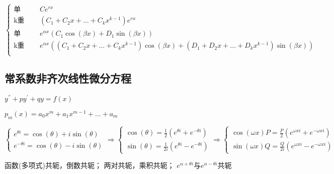 \documentclass[UTF8]{ctexart}
\begin{document}
$\left\{ 
    \begin{array}{ll}
        \text{单实根}   &\quad Ce^{rx}\\
        \text{k重实根}  &\quad \left( C_1+C_2x+\dots +C_kx^{k-1}\right)e^{rx}\\
        \text{单复根}   &\quad e^{\alpha x}\left(C_1\cos\left(\beta x \right) +D_1\sin\left(\beta x \right)\right)\\
        \text{k重复根}  &\quad e^{\alpha x}\left(\left(C_1+C_2x+\dots+C_kx^{k-1} \right)\cos\left(\beta x \right) +\left(D_1+D_2x+\dots+D_kx^{k-1} \right)\sin\left(\beta x \right)\right)\\
    \end{array}
\right.$

\subsection{常系数非齐次线性微分方程}
$y^{''}+py^{'}+qy=f\left(x\right)$\par

$p_m\left(x\right)=a_0x^m+a_1x^{m-1}+\dots+a_m$\par

$
\left\{
\begin{array}{l}
e^{\theta i}=\cos\left(\theta\right)+i\sin\left(\theta\right)\\
e^{-\theta i}=\cos\left(\theta\right)-i\sin\left(\theta\right)
\end{array}
\right.
\Rightarrow
\left\{
\begin{array}{l}
    \cos\left(\theta\right)=\frac{1}{2}\left(e^{\theta i}+e^{-\theta i}\right)\\
    \sin\left(\theta\right)=\frac{1}{2i}\left(e^{\theta i}-e^{-\theta i}\right)
\end{array}
\right.
\Rightarrow
\left\{
\begin{array}{l}
    \cos\left(\omega x \right)P=\frac{P}{2}\left(e^{\omega x i}+e^{-\omega x i}\right)\\
    \sin\left(\omega x \right)Q=\frac{Q}{2i}\left(e^{\omega x i}-e^{-\omega x i}\right)
\end{array}
\right.
$\par
函数(多项式)共轭，倒数共轭；\quad
两对共轭，乘积共轭；\quad
$e^{\alpha+ \theta i}\text{与} e^{\alpha -\theta i}$共轭\par
\end{document}
